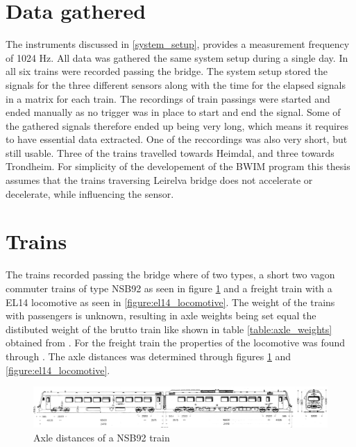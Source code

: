 \section{Data gathered}
The instruments discussed in \ref{system_setup}, provides a measurement frequency of 1024 Hz. All data was gathered the same system setup during a single day.
In all six trains were recorded passing the bridge. The system setup stored the signals for the three different sensors along with the time for the elapsed signals in a matrix for each train. The recordings of train passings were started and ended manually as no trigger was in place to start and end the signal. Some of the gathered signals therefore ended up being very long, which means it requires to have essential data extracted. One of the reccordings was also very short, but still usable.
Three of the trains travelled towards Heimdal, and three towards Trondheim.
For simplicity of the developement of the BWIM program this thesis assumes that the trains traversing Leirelva bridge does not accelerate or decelerate, while influencing the sensor.
\section{Trains}
\label{trains}
The trains recorded passing the bridge where of two types, a short two vagon commuter trains of type NSB92 as seen in figure \ref{appendix:nsb92} and a freight train with a EL14 locomotive as seen in \ref{figure:el14_locomotive}. The weight of the trains with passengers is unknown, resulting in axle weights being set equal the distibuted weight of the brutto train like shown in table \ref{table:axle_weights} obtained from \cite[p.~81]{lok_motorvogner}. For the freight train the properties of the locomotive was found through \cite{infoEL14}.
The axle distances was determined through figures \ref{appendix:nsb92} and \ref{figure:el14_locomotive}.
\begin{figure}[H]
	\begin{adjustbox}{center}
		\includegraphics[width=0.8\pagewidth]{./figures/nsb92.png}
	\end{adjustbox}
	\caption{Axle distances of a NSB92 train}
	\label{appendix:nsb92}
\end{figure}


